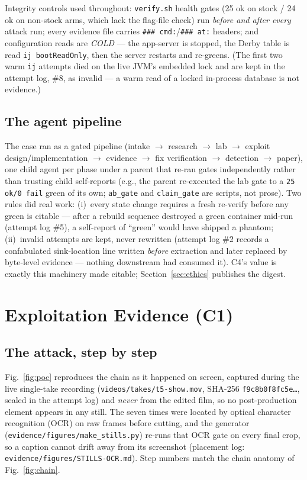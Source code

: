 \documentclass[journal]{IEEEtran}
\begin{document}
Integrity controls used throughout: \texttt{verify.sh} health gates (25 ok on
stock / 24 ok on non-stock arms, which lack the flag-file check) run
\emph{before and after every} attack run; every evidence file carries
\texttt{\#\#\#\ cmd:}/\texttt{\#\#\#\ at:} headers; and configuration reads are
\emph{COLD} — the app-server is stopped, the Derby table is read
\texttt{ij bootReadOnly}, then the server restarts and re-greens. (The first
two warm \texttt{ij} attempts died on the live JVM's embedded lock and are kept
in the attempt log, \#8, as invalid — a warm read of a locked in-process
database is not evidence.)

\subsection{The agent pipeline}
The case ran as a gated pipeline (intake $\rightarrow$ research $\rightarrow$
lab $\rightarrow$ exploit design/implementation $\rightarrow$ evidence $\rightarrow$
fix verification $\rightarrow$ detection $\rightarrow$ paper), one child agent
per phase under a parent that re-ran gates independently rather than trusting
child self-reports (e.g., the parent re-executed the lab gate to a
\texttt{25 ok/0 fail} green of its own; \texttt{ab\_gate} and
\texttt{claim\_gate} are scripts, not prose). Two rules did real work: (i)~every
state change requires a fresh re-verify before any green is citable — after a
rebuild sequence destroyed a green container mid-run (attempt log \#5), a
self-report of ``green'' would have shipped a phantom; (ii)~invalid attempts
are kept, never rewritten (attempt log \#2 records a confabulated
sink-location line written \emph{before} extraction and later replaced by
byte-level evidence — nothing downstream had consumed it). C4's value is
exactly this machinery made citable; Section~\ref{sec:ethics} publishes the
digest.

\section{Exploitation Evidence (C1)}
\label{sec:exploit}

\subsection{The attack, step by step}
\label{sec:pocwalk}

Fig.~\ref{fig:poc} reproduces the chain as it happened on screen, captured
during the live single-take recording (\texttt{videos/takes/t5-show.mov},
SHA-256 \texttt{f9c8b0f8fc5e\ldots}, sealed in the attempt log) and
\emph{never} from the edited film, so no post-production element appears in
any still. The seven times were located by optical character recognition
(OCR) on raw frames before cutting, and the generator
(\texttt{evidence/figures/make\allowbreak\_stills.py}) re-runs that OCR gate
on every final crop, so a caption cannot drift away from its screenshot
(placement log: \texttt{evidence/figures/STILLS-OCR.md}). Step numbers match
the chain anatomy of Fig.~\ref{fig:chain}.
\end{document}

